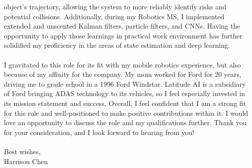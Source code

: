 \documentclass{coverletter}
\begin{document}
object's trajectory, allowing the system to more reliably identify risks and potential
collisions. Additionally, during my Robotics MS, I implemented extended and unscented
Kalman filters, particle filters, and CNNs. Having the opportunity to apply those
learnings in practical work environment has further solidified my proficiency in the
areas of state estimation and deep learning.
\\~\\
I gravitated to this role for its fit with my mobile robotics experience, but also
because of my affinity for the company. My mom worked for Ford for 20 years, driving me
to grade school in a 1996 Ford Windstar. Latitude AI is a subsidiary of Ford bringing
ADAS technology to its vehicles, so I feel especially invested in its mission statement
and success. Overall, I feel confident that I am a strong fit for this role and well-positioned to
make positive contributions within it. I would love an opportunity to discuss the role
and my qualifications further. Thank you for your consideration, and I look forward to
hearing from you!
\\~\\
Best wishes,
\\
Harrison Chen
\end{document}
